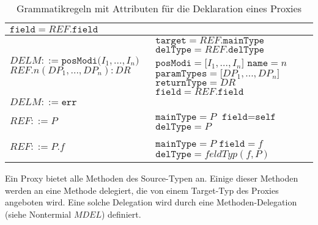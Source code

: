 \begin{table}[h!]
\begin{tabular}{|p{6cm}|p{8cm}|}
$\texttt{field} = \mathit{REF}\texttt{.field}$
\\
\hline
$\mathit{DELM} ::=\texttt{posModi(} \mathit{I_1},...,\mathit{I_n} \texttt{)}$\newline
$\mathit{REF}\texttt{.}n(\mathit{DP_1},...,\mathit{DP_n}):DR $  
&
$\texttt{target} = \mathit{REF}.\texttt{mainType}$\newline
$\texttt{delType} = \mathit{REF}.\texttt{delType}$\newline
$\texttt{posModi} = \mathit{[I_1},...,\mathit{I_n]}$\newline
$\texttt{name} = \mathit{n}$\newline
$\texttt{paramTypes} = \mathit{[DP_1},...,\mathit{DP_n]}$\newline
$\texttt{returnType} = \mathit{DR}$\newline
$\texttt{field} = \mathit{REF}\texttt{.field}$
\\
\hline
$\mathit{DELM} ::= \texttt{err} $  
&
\\
\hline
$\mathit{REF} ::= \mathit{P}$
& 
$\texttt{mainType} = \mathit{P}$\newline
$\texttt{field} = \texttt{self}$\newline
$\texttt{delType} = \mathit{P}$
\\
\hline
$\mathit{REF} ::= \mathit{P}\texttt{.}\mathit{f}$
&
$\texttt{mainType} = \mathit{P}$\newline
$\texttt{field} = \mathit{f}$\newline
$\texttt{delType} = \mathit{feldTyp(f,P)}$
\\
\hline
\end{tabular}
\caption{Grammatikregeln mit Attributen für die Deklaration eines Proxies}
 \label{tab:attrGrProxies}
\end{table}
\noindent
Ein Proxy bietet alle Methoden des Source-Typen an. Einige dieser Methoden werden an eine Methode delegiert, die von einem Target-Typ des Proxies angeboten wird. Eine solche Delegation wird durch eine Methoden-Delegation (siehe Nontermial $\mathit{MDEL}$) definiert.
